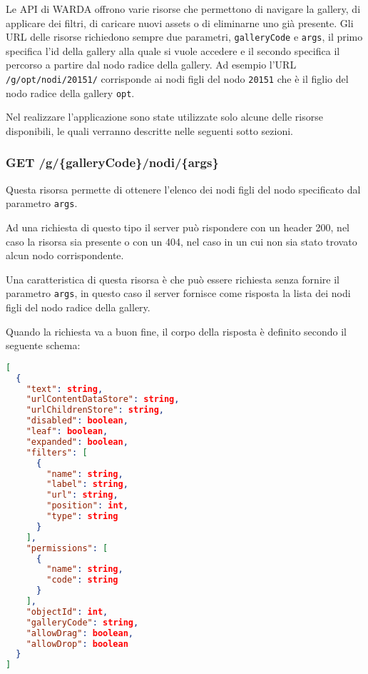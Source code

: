 Le API di WARDA offrono varie risorse che permettono di navigare la gallery, di applicare dei filtri, di caricare nuovi assets o di eliminarne uno già presente.
Gli URL delle risorse richiedono sempre due parametri, \texttt{galleryCode} e \texttt{args}, il primo specifica l'id della gallery alla quale si vuole accedere e il secondo specifica il percorso a partire dal nodo radice della gallery.
Ad esempio l'URL \texttt{/g/opt/nodi/20151/} corrisponde ai nodi figli del nodo \texttt{20151} che è il figlio del nodo radice della gallery \texttt{opt}.

Nel realizzare l'applicazione sono state utilizzate solo alcune delle risorse disponibili, le quali verranno descritte nelle seguenti sotto sezioni. 

\subsubsection{GET /g/\{galleryCode\}/nodi/\{args\}}\label{sec:nodes}

Questa risorsa permette di ottenere l'elenco dei nodi figli del nodo specificato dal parametro \texttt{args}.

Ad una richiesta di questo tipo il server può rispondere con un header 200, nel caso la risorsa sia presente o con un 404, nel caso in un cui non sia stato trovato alcun nodo corrispondente.

Una caratteristica di questa risorsa è che può essere richiesta senza fornire il parametro \texttt{args}, in questo caso il server fornisce come risposta la lista dei nodi figli del nodo radice della gallery.

Quando la richiesta va a buon fine, il corpo della risposta è definito secondo il seguente schema:
\begin{lstlisting}[language=JSON, caption=JSON Schema di GET /g/\{galleryCode\}/nodi/\{args\}]
[
  {
    "text": string,
    "urlContentDataStore": string,
    "urlChildrenStore": string,
    "disabled": boolean,
    "leaf": boolean,
    "expanded": boolean,
    "filters": [
      {
        "name": string,
        "label": string,
        "url": string,
        "position": int,
        "type": string
      }
    ],
    "permissions": [
      {
        "name": string,
        "code": string
      }
    ],
    "objectId": int,
    "galleryCode": string,
    "allowDrag": boolean,
    "allowDrop": boolean
  }
]
\end{lstlisting}
\FloatBarrier

